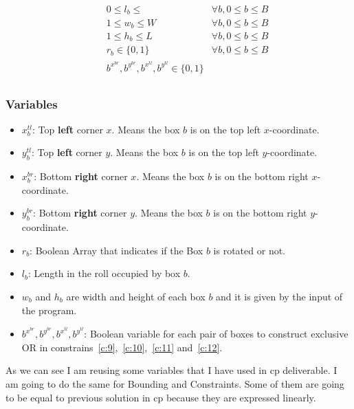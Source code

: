 \documentclass[12pt, a4paper]{article}
\begin{document}
\begin{subequations}
\begin{align}
 \quad & 0 \leq l_b \leq \quad & \forall b, 0 \leq b \leq B \\\label{b:5}
 \quad & 1 \leq w_b \leq W \quad & \forall b, 0 \leq b \leq B \\\label{b:6}
 \quad & 1 \leq h_b \leq L \quad & \forall b, 0 \leq b \leq B \\\label{b:7}
 \quad & r_b \in \{0,1\} \quad & \forall b, 0 \leq b \leq B \\\label{b:8}
 \quad & b^{x^{br}}, b^{y^{br}}, b^{x^{tl}}, b^{y^{tl}} \in \{0,1\} \\\label{b:9}
\end{align}
\end{subequations}

\subsubsection{Variables}
\begin{itemize}
  \item $x_b^{tl}$: Top \textbf{left} corner $x$. Means the box $b$ is on the top left $x$-coordinate.
  \item $y_b^{tl}$: Top \textbf{left} corner $y$. Means the box $b$ is on the top left $y$-coordinate.
  \item $x_b^{br}$: Bottom \textbf{right} corner $x$. Means the box $b$ is on the bottom right $x$-coordinate.
  \item $y_b^{br}$: Bottom \textbf{right} corner $y$. Means the box $b$ is on the bottom right $y$-coordinate.
  \item $r_b$: Boolean Array that indicates if the Box $b$ is rotated or not.
  \item $l_b$: Length in the roll occupied by box $b$.
  \item $w_b$ and $h_b$ are width and height of each box $b$ and it is given by the input of the program.
  \item $b^{x^{br}}, b^{y^{br}}, b^{x^{tl}}, b^{y^{tl}}$: Boolean variable for each pair of boxes to construct exclusive OR in constrains~\ref{c:9},~\ref{c:10},~\ref{c:11} and~\ref{c:12}.
\end{itemize}

As we can see I am reusing some variables that I have used in \acrfull{cp} deliverable. I am going to do the same for Bounding and Constraints. Some of them are going to be equal to previous solution in \acrshort{cp} because they are expressed linearly.
\end{document}
